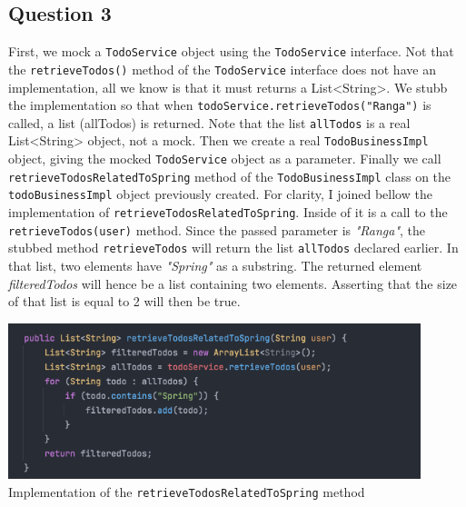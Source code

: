 \subsection*{Question 3}

\noindent First, we mock a \verb|TodoService| object using the \verb|TodoService| interface. Not that the \verb|retrieveTodos()| method of the \verb|TodoService| interface does not have an implementation, all we know is that it must returns a List<String>. We stubb the implementation so that when \verb|todoService.retrieveTodos("Ranga")| is called, a list (allTodos) is returned. Note that the list \verb|allTodos| is a real List<String> object, not a mock. Then we create a real \verb|TodoBusinessImpl| object, giving the mocked \verb|TodoService| object as a parameter. Finally we call \verb|retrieveTodosRelatedToSpring| method of the \verb|TodoBusinessImpl| class on the \verb|todoBusinessImpl| object previously created. For clarity, I joined bellow the implementation of \verb|retrieveTodosRelatedToSpring|. Inside of it is a call to the \verb|retrieveTodos(user)| method. Since the passed parameter is \textit{"Ranga"}, the stubbed method \verb|retrieveTodos| will return the list \verb|allTodos| declared earlier. In that list, two elements have \textit{"Spring"} as a substring. The returned element \textit{filteredTodos} will hence be a list containing two elements. Asserting that the size of that list is equal to 2 will then be true. 
\begin{center}
        \includegraphics[width=0.9\textwidth]{img/partc.png}
        \noindent  Implementation of the \verb|retrieveTodosRelatedToSpring| method
\end{center}